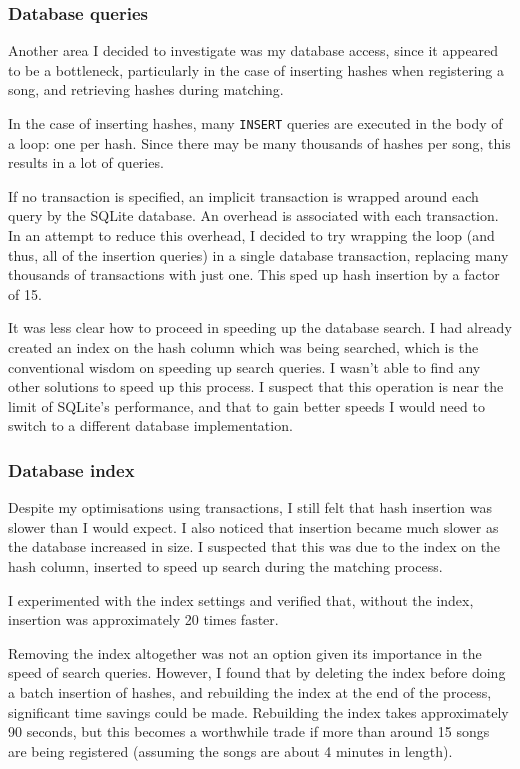 \documentclass[12pt,a4paper,twoside,openright]{report}
\begin{document}
\subsubsection{Database queries}

Another area I decided to investigate was my database access, since it appeared to be a bottleneck, particularly in the case of inserting hashes when registering a song, and retrieving hashes during matching.

In the case of inserting hashes, many \lstinline{INSERT} queries are executed in the body of a loop: one per hash. Since there may be many thousands of hashes per song, this results in a lot of queries.

If no transaction is specified, an implicit transaction is wrapped around each query by the SQLite database. An overhead is associated with each transaction. In an attempt to reduce this overhead, I decided to try wrapping the loop (and thus, all of the insertion queries) in a single database transaction, replacing many thousands of transactions with just one. This sped up hash insertion by a factor of 15.

It was less clear how to proceed in speeding up the database search. I had already created an index on the hash column which was being searched, which is the conventional wisdom on speeding up search queries. I wasn't able to find any other solutions to speed up this process. I suspect that this operation is near the limit of SQLite's performance, and that to gain better speeds I would need to switch to a different database implementation.

\subsubsection{Database index}

Despite my optimisations using transactions, I still felt that hash insertion was slower than I would expect. I also noticed that insertion became much slower as the database increased in size. I suspected that this was due to the index on the hash column, inserted to speed up search during the matching process.

I experimented with the index settings and verified that, without the index, insertion was approximately 20 times faster.

Removing the index altogether was not an option given its importance in the speed of search queries. However, I found that by deleting the index before doing a batch insertion of hashes, and rebuilding the index at the end of the process, significant time savings could be made. Rebuilding the index takes approximately 90 seconds, but this becomes a worthwhile trade if more than around 15 songs are being registered (assuming the songs are about 4 minutes in length).
\end{document}

